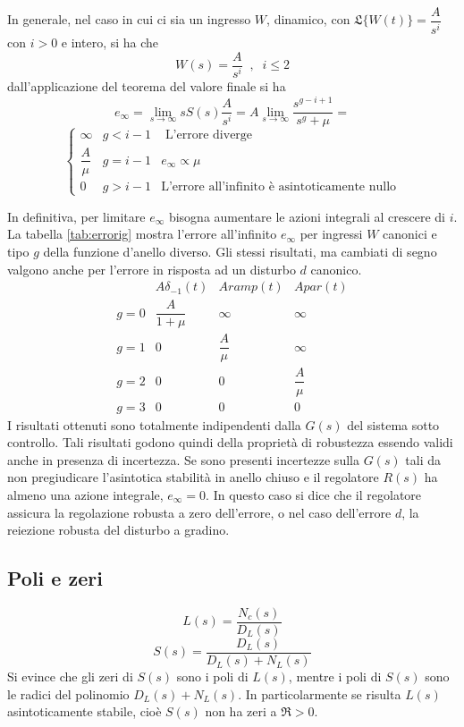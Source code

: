 \documentclass[a4paper]{report}
\begin{document}
In generale, nel caso in cui ci sia un ingresso $W$, dinamico, con
$\mathfrak{L}\{ W(t)\} = \dfrac{A}{s^i}$ con $i > 0$ e intero, si ha
che
\[
W(s) = \dfrac{A}{s^i} \;\;,\;\; i \leq 2
\]
dall'applicazione del teorema del valore finale si ha
\[
e_{\infty} = \lim_{s \to \infty} sS(s) \dfrac{A}{s^i} = A \lim_{s \to
  \infty} \dfrac{s^{g-i+1}}{s^g + \mu} = 
\]
\[
\left \{
\begin{array}{cll}
  \infty & g < i -1 & \textrm{ L'errore diverge}\\
  \dfrac{A}{\mu} & g = i -1 & e_{\infty} \propto \mu\\
  0 & g > i - 1 & \textrm{L'errore all'infinito \`e asintoticamente nullo} 
\end{array}
\right .
\]

In definitiva, per limitare $e_{\infty}$ bisogna aumentare le azioni
integrali al crescere di $i$. La tabella \ref{tab:errorig} mostra
l'errore all'infinito $e_{\infty}$ per ingressi $W$ canonici e tipo
$g$ della funzione d'anello diverso. Gli stessi risultati, ma cambiati
di segno valgono anche per l'errore in risposta ad un disturbo $d$
canonico.
\begin{equation}\label{tab:errorig}
  \begin{array}{cccc}
    & A\delta_{-1}(t) & Aramp(t) & Apar(t)\\
    g = 0 & \dfrac{A}{1 + \mu} & \infty & \infty\\
    g = 1 & 0 & \dfrac{A}{\mu} & \infty \\
    g = 2 & 0 & 0 & \dfrac{A}{\mu}\\
    g = 3 & 0 & 0 & 0
  \end{array}
\end{equation}
I risultati ottenuti sono totalmente indipendenti dalla $G(s)$ del
sistema sotto controllo. Tali risultati godono quindi della
propriet\`a di robustezza essendo validi anche in presenza di
incertezza. Se sono presenti incertezze sulla $G(s)$ tali da non
pregiudicare l'asintotica stabilit\`a in anello chiuso e il regolatore
$R(s)$ ha almeno una azione integrale, $e_{\infty} = 0$. In questo
caso si dice che il regolatore assicura la regolazione robusta a zero
dell'errore, o nel caso dell'errore $d$, la reiezione robusta del
disturbo a gradino.
\subsection{Poli e zeri}
\[
L(s) = \dfrac{N_c(s)}{D_L(s)}
\]
\[
S(s) = \dfrac{D_L(s)}{D_L(s) + N_L(s)}
\]
Si evince che gli zeri di $S(s)$ sono i poli di $L(s)$, mentre i poli
di $S(s)$ sono le radici del polinomio $D_L(s) + N_L(s)$. In
particolarmente se risulta $L(s)$ asintoticamente stabile, cio\`e
$S(s)$ non ha zeri a $\mathfrak{R} > 0$.
\end{document}
